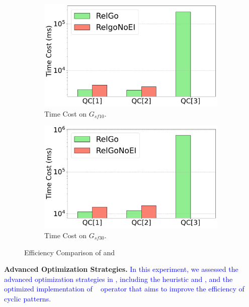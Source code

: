 \begin{figure}[ht]
    \centering
    \begin{subfigure}[b]{.45\linewidth}
        \centering
        \includegraphics[width=\linewidth]{./figures/exp/ablation_ei_sf10.pdf}
        \caption{Time Cost on $G_{sf10}$.}
        \label{fig:exp-expand-intersect-sf10}
    \end{subfigure}
    \begin{subfigure}[b]{0.45\linewidth}
        \centering
        \includegraphics[width=\linewidth]{./figures/exp/ablation_ei_sf30.pdf}
        \caption{Time Cost on $G_{sf30}$.}
        \label{fig:exp-expand-intersect-sf30}
    \end{subfigure}
    \caption{Efficiency Comparison of \name and \relgomj}
    \label{fig:exp-expand-intersect}
\end{figure}

\noindent\textbf{Advanced Optimization Strategies.}
\textcolor{blue}{
In this experiment, we assessed the advanced optimization strategies in \name, including the heuristic \filterrule and \joinfuserule, and the optimized implementation of \intersect~ operator that aims to improve the efficiency of cyclic patterns.
}

